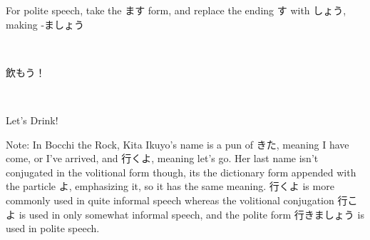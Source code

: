 \documentclass{article}
\begin{document}
\begin{CJK}{UTF8}{min}
For polite speech, take the ます form, and replace the ending す with しょう, making -ましょう

\begin{example}
\ 

飲もう！
\end{example}

\begin{solution}
\ 

Let's Drink!
\end{solution}

Note: In Bocchi the Rock, Kita Ikuyo's name is a pun of きた, meaning I have come, or I've arrived, and 行くよ, meaning let's go. Her last name isn't conjugated in the volitional form though, its the dictionary form appended with the particle よ, emphasizing it, so it has the same meaning. 行くよ is more commonly used in quite informal speech whereas the volitional conjugation 行こよ is used in only somewhat informal speech, and the polite form 行きましょう is used in polite speech. 
\end{CJK}
\end{document}

